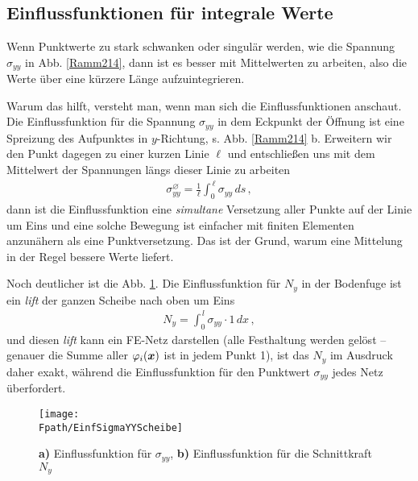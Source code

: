 {\textcolor{sectionTitleBlue}{\section{Einflussfunktionen f\"{u}r integrale Werte}}}

Wenn Punktwerte zu stark schwanken oder singul\"{a}r werden, wie die Spannung $\sigma_{yy}$ in Abb. \ref{Ramm214}, dann ist es besser mit Mittelwerten zu arbeiten, also die Werte \"{u}ber eine k\"{u}rzere L\"{a}nge aufzuintegrieren.

Warum das hilft, versteht man, wenn man sich die Einflussfunktionen anschaut. Die Einflussfunktion f\"{u}r die Spannung $\sigma_{yy}$ in dem Eckpunkt der \"{O}ffnung ist eine Spreizung des Aufpunktes in $y$-Richtung, s. Abb. \ref{Ramm214} b. Erweitern wir den Punkt dagegen zu einer kurzen Linie $\ell$ und entschlie{\ss}en uns mit dem Mittelwert der Spannungen l\"{a}ngs dieser Linie zu arbeiten
\begin{align}
\sigma_{yy}^\varnothing = \frac{1}{\ell } \int_0^{\,\ell} \sigma_{yy}\,ds \,,
\end{align}
dann ist die Einflussfunktion eine {\em simultane\/} Versetzung aller Punkte auf der Linie um Eins und eine solche Bewegung ist einfacher mit finiten Elementen anzun\"{a}hern als eine Punktversetzung. Das ist der Grund, warum eine Mittelung in der Regel bessere Werte liefert.

Noch deutlicher ist die Abb. \ref{EinfSigmaYYScheibe}. Die Einflussfunktion f\"{u}r $N_y$ in der Bodenfuge ist ein {\em lift\/} der ganzen Scheibe nach oben um Eins
\begin{align}
N_y = \int_0^{\,l} \sigma_{yy} \cdot 1 \,dx\,,
\end{align}
und diesen {\em lift\/} kann ein FE-Netz darstellen (alle Festhaltung werden gel\"{o}st -- genauer die Summe aller $\varphi_i(\mbox{\boldmath $x$})$ ist in jedem Punkt 1), ist das $N_y$ im Ausdruck daher exakt, w\"{a}hrend die Einflussfunktion f\"{u}r den Punktwert $\sigma_{yy}$ jedes Netz \"{u}berfordert.
\begin{figure}[tbp] \centering
\if {} \sidecaption \fi
\texttt{[image: \\Fpath/EinfSigmaYYScheibe]}
\caption{{\bf a)} Einflussfunktion f\"{u}r $\sigma_{yy}$, {\bf b)} Einflussfunktion f\"{u}r die
Schnittkraft $N_y$} \label{EinfSigmaYYScheibe}
\end{figure}%

